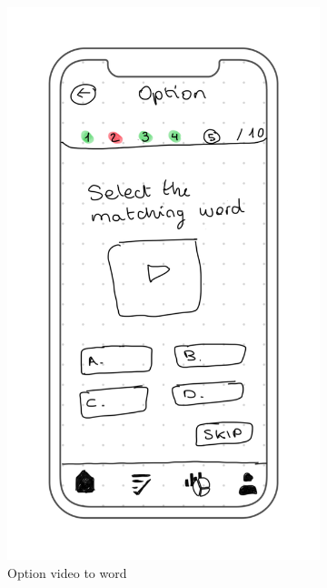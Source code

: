 \begin{figure}[H]
\begin{subfigure}[T]{0.24\textwidth}
        \includegraphics[width=\textwidth]{assets/screens/quiz/Quiz - Option 1.png}
        \caption{Option video to word}
        \label{fig:design_screen_mimic}
    \end{subfigure}
    \hfill
    \begin{subfigure}[T]{0.24\textwidth}
        \centering

\end{subfigure}
\end{figure}

